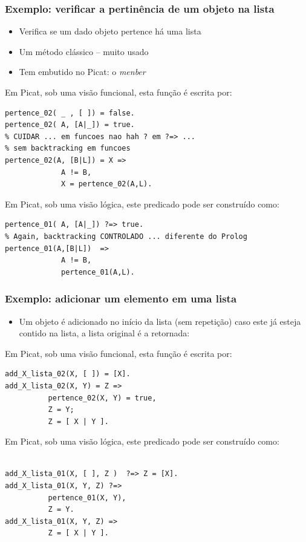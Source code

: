 \begin{frame}[fragile, allowframebreaks=0.9]
\frametitle{Exemplo: verificar a pertinência de um objeto na lista}

\begin{itemize}
  \item Verifica se um dado objeto pertence há uma  lista
  \item Um método clássico -- muito usado
  \item Tem embutido no Picat: o \textit{menber}
\end{itemize}

Em Picat, sob uma visão funcional, esta função é escrita por:

 \begin{verbatim}
pertence_02( _ , [ ]) = false. 
pertence_02( A, [A|_]) = true. 
% CUIDAR ... em funcoes nao hah ? em ?=> ... 
% sem backtracking em funcoes
pertence_02(A, [B|L]) = X => 
             A != B,
             X = pertence_02(A,L).
\end{verbatim}



\framebreak
Em Picat, sob uma visão lógica, este predicado 
pode ser construído como:
\begin{verbatim}
pertence_01( A, [A|_]) ?=> true. 
% Again, backtracking CONTROLADO ... diferente do Prolog
pertence_01(A,[B|L])  => 
             A != B,
             pertence_01(A,L).
\end{verbatim}

\end{frame}


\begin{frame}[fragile, allowframebreaks=0.9]
\frametitle{Exemplo: adicionar um elemento  em uma lista}

\begin{itemize}
  \item Um objeto é adicionado no início da lista (sem repeti\c{c}ão) caso este já
 esteja contido na lista, a lista original é a retornada:
\end{itemize}

Em Picat, sob uma visão funcional, esta função é escrita por:
 
\begin{verbatim}
add_X_lista_02(X, [ ]) = [X]. 
add_X_lista_02(X, Y) = Z =>
          pertence_02(X, Y) = true,
          Z = Y;
          Z = [ X | Y ].
\end{verbatim}


\framebreak
Em Picat, sob uma visão lógica, este predicado 
pode ser construído como:
\begin{verbatim}

add_X_lista_01(X, [ ], Z )  ?=> Z = [X]. 
add_X_lista_01(X, Y, Z) ?=>
          pertence_01(X, Y),
          Z = Y.
add_X_lista_01(X, Y, Z) =>
          Z = [ X | Y ].

\end{verbatim}

\end{frame}





